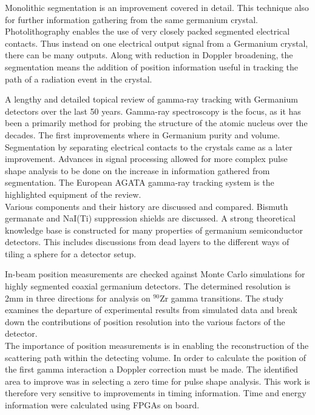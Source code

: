 \documentclass[12pt]{article}
\begin{document}
\begin{doublespacing}
Monolithic segmentation is an improvement covered in detail.
This technique also for further information gathering from the same germanium crystal.
Photolithography enables the use of very closely packed segmented electrical contacts.
Thus instead on one electrical output signal from a Germanium crystal, there can be many outputs.
Along with reduction in Doppler broadening, the segmentation means the addition of position information useful in tracking the path of a radiation event in the crystal.


\citep{Eberth2008283}
A lengthy and detailed topical review of gamma-ray tracking with Germanium detectors over the last 50 years.
Gamma-ray spectroscopy is the focus, as it has been a primarily method for probing the structure of the atomic nucleus over the decades.
The first improvements where in Germanium purity and volume.
Segmentation by separating electrical contacts to the crystals came as a later improvement.
Advances in signal processing allowed for more complex pulse shape analysis to be done on the increase in information gathered from segmentation.
The European AGATA gamma-ray tracking system is the highlighted equipment of the review.
\\

Various components and their history are discussed and compared.
Bismuth germanate and NaI(Ti) suppression shields are discussed.
A strong theoretical knowledge base is constructed for many properties of germanium semiconductor detectors.
This includes discussions from dead layers to the different ways of tiling a sphere for a detector setup.


\citep{Descovich2005535}
In-beam position measurements are checked against Monte Carlo simulations for highly segmented coaxial germanium detectors.
The determined resolution is 2mm in three directions for analysis on $^{90}\mbox{Zr}$ gamma transitions.
The study examines the departure of experimental results from simulated data and break down the contributions of position resolution into the various factors of the detector.
\\

The importance of position measurements is in enabling the reconstruction of the scattering path within the detecting volume.
In order to calculate the position of the first gamma interaction a Doppler correction must be made.
The identified area to improve was in selecting a zero time for pulse shape analysis.
This work is therefore very sensitive to improvements in timing information.
Time and energy information were calculated using FPGAs on board.



\end{doublespacing}
\end{document}
